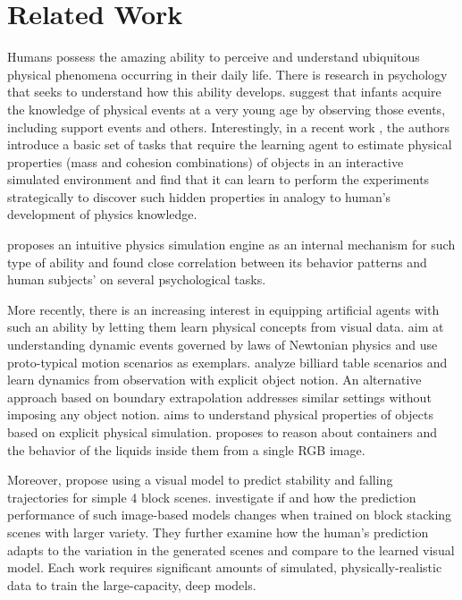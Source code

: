 \section{Related Work}
Humans possess the amazing ability to perceive and understand ubiquitous physical phenomena occurring in their daily life. There is research in psychology that seeks to understand how this ability develops. \cite{baillargeon2002acquisition} suggest that infants acquire the knowledge of physical events at a very young age by observing those events, including support events and others. 
Interestingly, in a recent work \cite{denil2016learning}, the authors introduce a basic set of tasks that require the learning agent to estimate physical properties (mass and cohesion combinations) of objects in an interactive simulated environment and find that it can learn to perform the experiments strategically to discover such hidden properties in analogy to human's development of physics knowledge.

\cite{battaglia2013simulation} proposes an intuitive physics simulation engine as an internal mechanism for such type of ability and found close correlation between its behavior patterns and human subjects' on several psychological tasks.

More recently, there is an increasing interest in equipping artificial agents with such an ability by letting them learn physical concepts from visual data. 
\cite{mottaghi2015newtonian} aim at understanding dynamic events governed by laws of Newtonian physics and use proto-typical motion scenarios as exemplars. \cite{fragkiadaki2015learning} analyze billiard table scenarios and learn dynamics from observation with explicit object notion. 
An alternative approach based on boundary extrapolation \cite{apratim16ariv} addresses similar settings without imposing any object notion. 
\cite{wu2015galileo} aims to understand physical properties of objects based on explicit physical simulation. 
\cite{mottaghi2017see} proposes to reason about containers and the behavior of the liquids inside them from a single RGB image.

Moreover, \cite{fergus16blocsarxiv} propose using a visual model to predict stability and falling trajectories for simple 4 block scenes. \cite{li2016fall} investigate if and how the prediction performance of such image-based models changes when trained on block stacking scenes with larger variety. They further examine how the human's prediction adapts to the variation in the generated scenes and compare to the learned visual model. Each work requires significant amounts of simulated, physically-realistic data to train the large-capacity, deep models.

